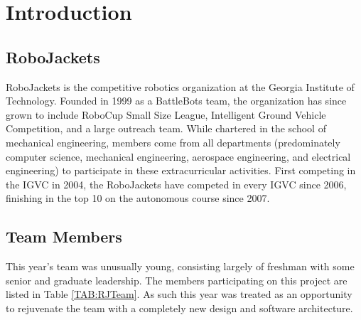 \section{Introduction}

\subsection{RoboJackets}

RoboJackets is the competitive robotics organization at the Georgia Institute of Technology. Founded in 1999 as a BattleBots team, the organization has since grown to include RoboCup Small Size League, Intelligent Ground Vehicle Competition, and a large outreach team. While chartered in the school of mechanical engineering, members come from all departments (predominately computer science, mechanical engineering, aerospace engineering, and electrical engineering) to participate in these extracurricular activities. First competing in the IGVC in 2004, the RoboJackets have competed in every IGVC since 2006, finishing in the top 10 on the autonomous course since 2007.

\subsection{Team Members}

This year's team was unusually young, consisting largely of freshman with some senior and graduate leadership. The members participating on this project are listed in Table \ref{TAB:RJTeam}. As such this year was treated as an opportunity to rejuvenate the team with a completely new design and software architecture.


